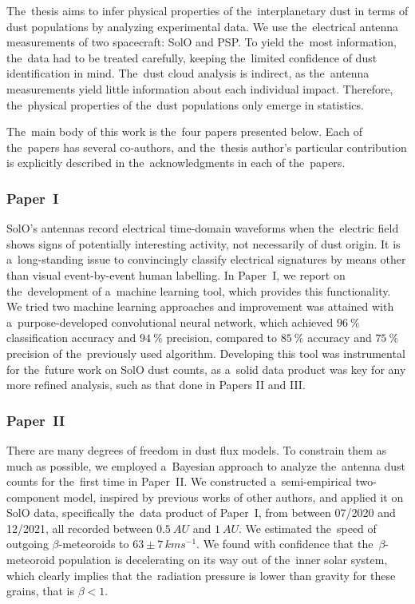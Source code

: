 The~thesis aims to infer physical properties of the~interplanetary dust in terms of dust populations by analyzing experimental data. We use the~electrical antenna measurements of two spacecraft: SolO and PSP. To yield the~most information, the~data had to be treated carefully, keeping the~limited confidence of dust identification in mind. The~dust cloud analysis is indirect, as the~antenna measurements yield little information about each individual impact. Therefore, the~physical properties of the~dust populations only emerge in statistics. 

The~main body of this work is the~four papers presented below. Each of the~papers has several co-authors, and the~thesis author's particular contribution is explicitly described in the~acknowledgments in each of the~papers.

\subsubsection{Paper~I}

SolO's antennas record electrical time-domain waveforms when the~electric field shows signs of potentially interesting activity, not necessarily of dust origin. It is a~long-standing issue to convincingly classify electrical signatures by means other than visual event-by-event human labelling. In Paper~I, we report on the~development of a~machine learning tool, which provides this functionality. We tried two machine learning approaches and improvement was attained with a~purpose-developed convolutional neural network, which achieved $\SI{96}{\%}$ classification accuracy and $\SI{94}{\%}$ precision, compared to $\SI{85}{\%}$ accuracy and $\SI{75}{\%}$ precision of the~previously used algorithm. Developing this tool was instrumental for the~future work on SolO dust counts, as a~solid data product was key for any more refined analysis, such as that done in Papers II and III. 

\subsubsection{Paper~II}

There are many degrees of freedom in dust flux models. To constrain them as much as possible, we employed a~Bayesian approach to analyze the~antenna dust counts for the~first time in Paper~II. We constructed a~semi-empirical two-component model, inspired by previous works of other authors, and applied it on SolO data, specifically the~data product of Paper~I, from between 07/2020 and 12/2021, all recorded between $\SI{0.5}{AU}$ and $\SI{1}{AU}$. We estimated the~speed of outgoing $\beta$-meteoroids to $63 \pm 7 \, \si{kms^{-1}}$. We found with confidence that the~$\beta$-meteoroid population is decelerating on its way out of the~inner solar system, which clearly implies that the~radiation pressure is lower than gravity for these grains, that is $\beta < 1$. 

